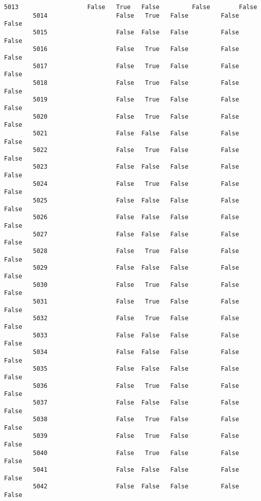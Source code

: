 \documentclass[11pt]{article}
\begin{document}
\begin{Verbatim}[commandchars=\\\{\}]
        5013                   False   True   False         False        False   
        5014                   False   True   False         False        False   
        5015                   False  False   False         False        False   
        5016                   False   True   False         False        False   
        5017                   False   True   False         False        False   
        5018                   False   True   False         False        False   
        5019                   False   True   False         False        False   
        5020                   False   True   False         False        False   
        5021                   False  False   False         False        False   
        5022                   False   True   False         False        False   
        5023                   False  False   False         False        False   
        5024                   False   True   False         False        False   
        5025                   False  False   False         False        False   
        5026                   False  False   False         False        False   
        5027                   False  False   False         False        False   
        5028                   False   True   False         False        False   
        5029                   False  False   False         False        False   
        5030                   False   True   False         False        False   
        5031                   False   True   False         False        False   
        5032                   False   True   False         False        False   
        5033                   False  False   False         False        False   
        5034                   False  False   False         False        False   
        5035                   False  False   False         False        False   
        5036                   False   True   False         False        False   
        5037                   False  False   False         False        False   
        5038                   False   True   False         False        False   
        5039                   False   True   False         False        False   
        5040                   False   True   False         False        False   
        5041                   False  False   False         False        False   
        5042                   False  False   False         False        False   
        

\end{Verbatim}
\end{document}

